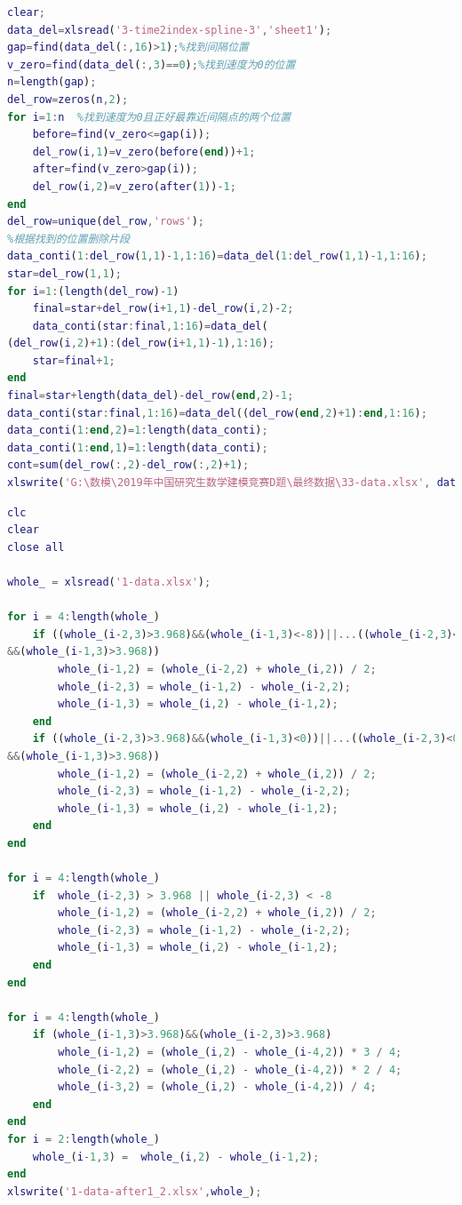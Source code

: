 \documentclass[bwprint]{gmcmthesis}
\begin{document}
\begin{lstlisting}[language=Matlab]%设置不同语言即可。
%删除超过阈值的片段
clear;
data_del=xlsread('3-time2index-spline-3','sheet1');
gap=find(data_del(:,16)>1);%找到间隔位置
v_zero=find(data_del(:,3)==0);%找到速度为0的位置
n=length(gap);
del_row=zeros(n,2);
for i=1:n  %找到速度为0且正好最靠近间隔点的两个位置
    before=find(v_zero<=gap(i));
    del_row(i,1)=v_zero(before(end))+1;
    after=find(v_zero>gap(i));
    del_row(i,2)=v_zero(after(1))-1;
end
del_row=unique(del_row,'rows');
%根据找到的位置删除片段
data_conti(1:del_row(1,1)-1,1:16)=data_del(1:del_row(1,1)-1,1:16);
star=del_row(1,1);
for i=1:(length(del_row)-1)
    final=star+del_row(i+1,1)-del_row(i,2)-2;
    data_conti(star:final,1:16)=data_del(
(del_row(i,2)+1):(del_row(i+1,1)-1),1:16);
    star=final+1;
end
final=star+length(data_del)-del_row(end,2)-1;
data_conti(star:final,1:16)=data_del((del_row(end,2)+1):end,1:16);
data_conti(1:end,2)=1:length(data_conti);
data_conti(1:end,1)=1:length(data_conti);
cont=sum(del_row(:,2)-del_row(:,2)+1);
xlswrite('G:\数模\2019年中国研究生数学建模竞赛D题\最终数据\33-data.xlsx', data_conti);
 \end{lstlisting}

\begin{lstlisting}[language=Matlab]%设置不同语言即可。
clc
clear
close all

whole_ = xlsread('1-data.xlsx');

for i = 4:length(whole_)
    if ((whole_(i-2,3)>3.968)&&(whole_(i-1,3)<-8))||...((whole_(i-2,3)<-8)
&&(whole_(i-1,3)>3.968))
        whole_(i-1,2) = (whole_(i-2,2) + whole_(i,2)) / 2;
        whole_(i-2,3) = whole_(i-1,2) - whole_(i-2,2);
        whole_(i-1,3) = whole_(i,2) - whole_(i-1,2);
    end
    if ((whole_(i-2,3)>3.968)&&(whole_(i-1,3)<0))||...((whole_(i-2,3)<0)
&&(whole_(i-1,3)>3.968))
        whole_(i-1,2) = (whole_(i-2,2) + whole_(i,2)) / 2;
        whole_(i-2,3) = whole_(i-1,2) - whole_(i-2,2);
        whole_(i-1,3) = whole_(i,2) - whole_(i-1,2);
    end
end

for i = 4:length(whole_)
    if  whole_(i-2,3) > 3.968 || whole_(i-2,3) < -8
        whole_(i-1,2) = (whole_(i-2,2) + whole_(i,2)) / 2;
        whole_(i-2,3) = whole_(i-1,2) - whole_(i-2,2);
        whole_(i-1,3) = whole_(i,2) - whole_(i-1,2);
    end
end

for i = 4:length(whole_)
    if (whole_(i-1,3)>3.968)&&(whole_(i-2,3)>3.968)
        whole_(i-1,2) = (whole_(i,2) - whole_(i-4,2)) * 3 / 4;
        whole_(i-2,2) = (whole_(i,2) - whole_(i-4,2)) * 2 / 4;
        whole_(i-3,2) = (whole_(i,2) - whole_(i-4,2)) / 4;
    end
end
for i = 2:length(whole_)
    whole_(i-1,3) =  whole_(i,2) - whole_(i-1,2);
end
xlswrite('1-data-after1_2.xlsx',whole_);

 \end{lstlisting}
\end{document}
